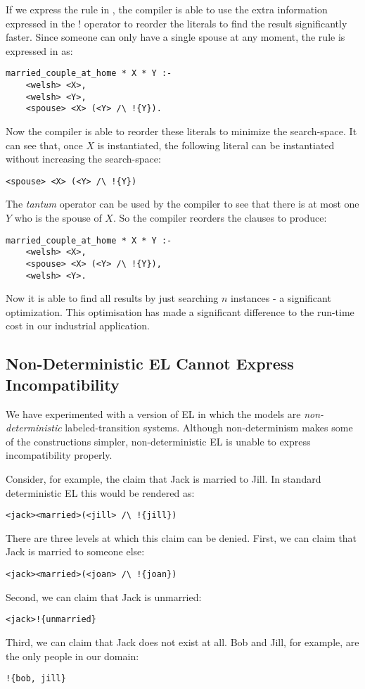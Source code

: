 If we express the rule in \ELFULL{}, the compiler is able to use the extra information expressed in the $!$ operator to reorder the literals to find the result significantly faster.
Since someone can only have a single spouse at any moment, the rule is expressed in \ELFULL{} as:
\begin{verbatim}
married_couple_at_home * X * Y :-
    <welsh> <X>,
    <welsh> <Y>,
    <spouse> <X> (<Y> /\ !{Y}).
\end{verbatim}	
Now the compiler is able to reorder these literals to minimize the search-space. 
It can see that, once $X$ is instantiated, the following literal can be instantiated without increasing the search-space:
\begin{verbatim}
<spouse> <X> (<Y> /\ !{Y})
\end{verbatim}
The \emph{tantum} operator can be used by the compiler to see that there is at most one $Y$ who is the spouse of $X$.
So the compiler reorders the clauses to produce:
\begin{verbatim}
married_couple_at_home * X * Y :-
    <welsh> <X>,
    <spouse> <X> (<Y> /\ !{Y}),
    <welsh> <Y>.
\end{verbatim}	
Now it is able to find all results by just searching $n$ instances - a significant optimization.
This optimisation has made a significant difference to the run-time cost in our industrial application.


\subsection{Non-Deterministic EL Cannot Express Incompatibility}

We have experimented with a version of EL in which the models are \emph{non-deterministic} labeled-transition systems.
Although non-determinism makes some of the constructions simpler, non-deterministic EL is unable to express incompatibility properly.

Consider, for example, the claim that Jack is married to Jill. 
In standard deterministic EL this would be rendered as:
\begin{verbatim}
<jack><married>(<jill> /\ !{jill})
\end{verbatim}
There are three levels at which this claim can be denied.
First, we can claim that Jack is married to someone else:
\begin{verbatim}
<jack><married>(<joan> /\ !{joan})
\end{verbatim}
Second, we can claim that Jack is unmarried:
\begin{verbatim}
<jack>!{unmarried}
\end{verbatim}
Third, we can claim that Jack does not exist at all. Bob and Jill, for example, are the only people in our domain:
\begin{verbatim}
!{bob, jill}
\end{verbatim}

